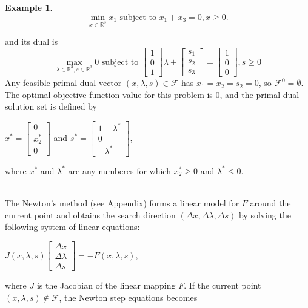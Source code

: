 \documentclass[a4paper,10 pt,titlepage,twoside]{book}
\theoremstyle{plain}
\theoremstyle{definition}
\newtheorem{ex}[thm]{Example}
\theoremstyle{remark}
\begin{document}
\begin{ex}
	\begin{equation*}
	\min\limits_{x\in\mathbb{R}^{3}} x_{1} \text{ subject to }x_{1} + x_{3} = 0, x\geq0.
	\end{equation*}

and its dual is 
	\begin{equation*}
\max\limits_{\lambda\in\mathbb{R}^{3}, s\in\mathbb{R}^{3}} 0 \text{ subject to } \begin{bmatrix}1\\0\\1\end{bmatrix}\lambda+\begin{bmatrix}
s_{1}\\s_{2}\\s_{3}
\end{bmatrix}=\begin{bmatrix}1\\0\\0\end{bmatrix}, s\geq0 
\end{equation*}
Any feasible primal-dual vector $(x, \lambda, s)\in\mathcal{F}$ has $x_{1}= x_{2}= s_{2}= 0$, so $\mathcal{F}^{0}=\emptyset$. The optimal objective function value for this problem is 0, and the primal-dual solution set is defined by
\begin{center}
$x^{*} = \begin{bmatrix}
0\\x^{*}_{2}\\ 0
\end{bmatrix}$ and $s^{*}=\begin{bmatrix}
1-\lambda^{*}\\0\\-\lambda^{*}
\end{bmatrix}$,  
\end{center}
where $x^{*}$ and $\lambda^{*}$ are any numberes for which $x_{2}^{*}\geq0$ and $\lambda^{*}\leq0$.
\end{ex}
\\
The Newton's method (see Appendix) forms a linear model for $\mathit{F}$ around the current point and obtains the search direction $(\Delta x,\Delta \lambda,\Delta s)$ by solving the following system of linear equations:
\begin{center}
	$\mathit{J}(x,\lambda,s)\begin{bmatrix}
	\Delta x\\\Delta\lambda \\\Delta s
	\end{bmatrix}=-\mathit{F}(x,\lambda,s)$,
\end{center}
where $\mathit{J}$ is the Jacobian of the linear mapping $\mathit{F}$. If the current point $(x, \lambda, s)\notin\mathcal{F}$, the Newton step equations becomes
\end{document}
